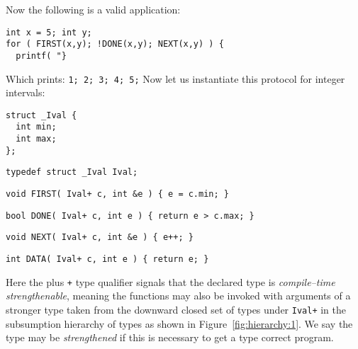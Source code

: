 \documentclass{sigplanconf}
\newcommand{\concept}[1]{\emph{#1}}
\begin{document}
Now the following is a valid application:
\begin{samepage}
\begin{verbatim}
int x = 5; int y;
for ( FIRST(x,y); !DONE(x,y); NEXT(x,y) ) {
  printf( "}
\end{verbatim}
\end{samepage}
Which prints: \verb+1; 2; 3; 4; 5;+ Now let us instantiate this
protocol for integer intervals:
\begin{samepage}
\begin{verbatim}
struct _Ival {
  int min;
  int max;
};
\end{verbatim}
\end{samepage}
\begin{samepage}
\begin{verbatim}
typedef struct _Ival Ival;
\end{verbatim}
\end{samepage}
\begin{samepage}
\begin{verbatim}
void FIRST( Ival+ c, int &e ) { e = c.min; }
\end{verbatim}
\end{samepage}
\begin{samepage}
\begin{verbatim}
bool DONE( Ival+ c, int e ) { return e > c.max; }
\end{verbatim}
\end{samepage}
\begin{samepage}
\begin{verbatim}
void NEXT( Ival+ c, int &e ) { e++; }
\end{verbatim}
\end{samepage}
\begin{samepage}
\begin{verbatim}
int DATA( Ival+ c, int e ) { return e; }
\end{verbatim}
\end{samepage}

Here the plus \verb-+- type qualifier signals that the declared type
is \concept{compile--time strengthenable}, meaning the functions may
also be invoked with arguments of a stronger type taken from the
downward closed set of types under \verb-Ival+- in the subsumption
hierarchy of types as shown in Figure~\ref{fig:hierarchy:1}. We say the
type may be \emph{strengthened} if this is necessary to get a type
correct program.
\end{document}
